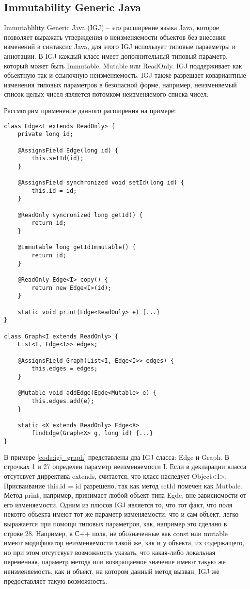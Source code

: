 \subsection{Immutability Generic Java}

Immutablility Generic Java (IGJ) -- это расширение языка Java, которое позволяет выражать утверждения о неизменяемости объектов без внесения изменений в синтаксис Java, для этого IGJ использует типовые параеметры и аннотации. В IGJ каждый класс имеет дополнительный типовый параметр, который может быть Immutable, Mutable или ReadOnly. IGJ поддерживает как объектную так и ссылочную неизменяемость. IGJ также разрешает ковариантные изменения типовых параметров в безопасной форме, например, неизменяемый список целых чисел является потомком неизменяемого списка чисел.

Рассмотрим применение данного расширения на примере:

\begin{lstlisting}[caption=Ключевое слово romaybe, label=code:igj_graph]
class Edge<I extends ReadOnly> {
    private long id;
    
    @AssignsField Edge(long id) {
        this.setId(id);
    }
    
    @AssignsField synchronized void setId(long id) {
        this.id = id;
    }
    
    @ReadOnly syncronized long getId() {
        return id;
    }
    
    @Immutable long getIdImmutable() {
        return id;
    }
    
    @ReadOnly Edge<I> copy() {
        return new Edge<I>(id);
    }
    
    static void print(Edge<ReadOnly> e) {...}
}

class Graph<I extends ReadOnly> {
    List<I, Edge<I>> edges;
    
    @AssignsField Graph(List<I, Edge<I>> edges) {
        this.edges = edges;
    }
    
    @Mutable void addEdge(Egde<Mutable> e) {
        this.edges.add(e);
    }
    
    static <X extends ReadOnly> Edge<X> 
        findEdge(Graph<X> g, long id) {...}
}
\end{lstlisting}

В примере \ref{code:igj_graph} представлены два IGJ сласса: Edge и Graph. В строчках 1 и 27 определен параметр неизменяемости I. Если в декларации класса отсутсвует дирректива extends, считается, что класс наследует Object<I>. Присваивание this.id = id разрешено, так как метод setId помечен как Mutbale. Метод print, например, принимает любой объект типа Egde, вне зависисмости от его изменяемости. Одним из плюсов IGJ является то, что тот факт, что поля некотго объекта имеют тот же параметр изменяемости, что и сам объект, легко выражается при помощи типовых параметров, как, например это сделано в строке 28. Например, в С++ поля, не обозначенные как const или mutable имеют модификатор неизменяемости такой же, как и у объекта, их содержащего, но при этом отсутсвует возможность указать, что какая-либо локальная переменная, параметр метода или возвращаемое значение имеют такую же неизменяемость, как и объект, на котором данный метод вызван, IGJ же предоставляет такую возможность.

